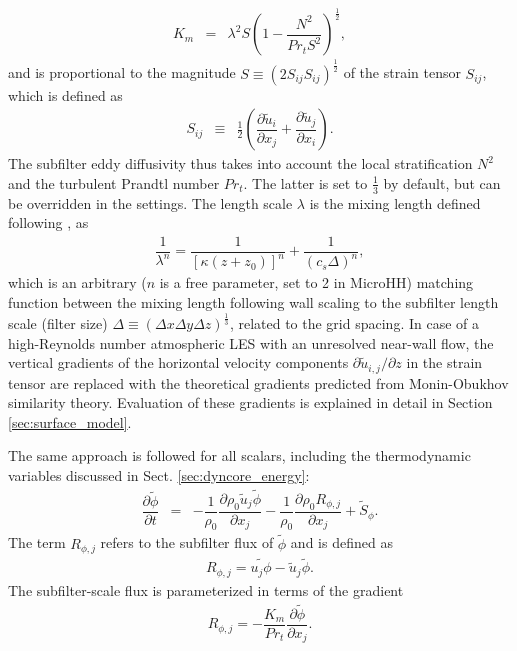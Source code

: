 \documentclass[gmd,manuscript]{copernicus}
\newcommand{\uf}{\ensuremath{\widetilde{u}}}
\newcommand{\phif}{\ensuremath{\widetilde{\phi}}}
\begin{document}
\begin{eqnarray}
K_m    & = & \lambda^2 S
\left(1 - \dfrac{N^2}{Pr_t S^2} \right)^\frac{1}{2},
\end{eqnarray}
and is proportional to the magnitude $S \equiv \left( 2 S_{ij} S_{ij} \right)^\frac{1}{2}$ of the strain tensor $S_{ij}$, which is defined as
\begin{eqnarray}
S_{ij} & \equiv & \frac{1}{2} \left( \dfrac{\partial \uf_i}{\partial x_j} + \dfrac{\partial \uf_j}{\partial x_i} \right).
\end{eqnarray}
The subfilter eddy diffusivity thus takes into account the local stratification $N^2$ and the turbulent Prandtl number $Pr_t$. The latter is set to $\frac{1}{3}$ by default, but can be overridden in the settings. The length scale  $\lambda$ is the mixing length defined following \citet{Mason1992}, as
\begin{eqnarray}
\dfrac{1}{\lambda^n} = \dfrac{1}{\left[ \kappa \left(z + z_0 \right) \right]^n} + \dfrac{1}{\left( c_s \Delta \right)^n},
\end{eqnarray}
which is an arbitrary ($n$ is a free parameter, set to 2 in MicroHH) matching function between the mixing length following wall scaling to the subfilter length scale (filter size) $\Delta \equiv (\Delta x \Delta y \Delta z)^\frac{1}{3}$, related to the grid spacing. In case of a high-Reynolds number atmospheric LES with an unresolved near-wall flow, the vertical gradients of the horizontal velocity components $\partial \uf_{i,j}/\partial z$  in the strain tensor are replaced with the theoretical gradients predicted from Monin-Obukhov similarity theory. Evaluation of these gradients is explained in detail in Section \ref{sec:surface_model}.

The same approach is followed for all scalars, including the thermodynamic variables discussed in Sect. \ref{sec:dyncore_energy}:
\begin{eqnarray}
\dfrac{\partial \phif}{\partial t} & = & - \dfrac{1}{\rho_0} \dfrac{\partial \rho_0 \uf_j \phif}{\partial x_j} - \dfrac{1}{\rho_0} \dfrac{\partial \rho_0 R_{\phi,j}}{\partial x_j} + \widetilde{S}_\phi. \label{eq:consscal_filter}
\end{eqnarray}
The term $R_{\phi,j}$ refers to the subfilter flux of $\phif$ and is defined as
\begin{eqnarray}
R_{\phi,j} = \widetilde{u_j \phi} - \uf_j \phif.
\end{eqnarray}
The subfilter-scale flux is parameterized in terms of the gradient
\begin{eqnarray}
R_{\phi,j} = - \dfrac{K_m}{Pr_t} \dfrac{\partial \phif}{\partial x_j}.
\end{eqnarray}
\end{document}
